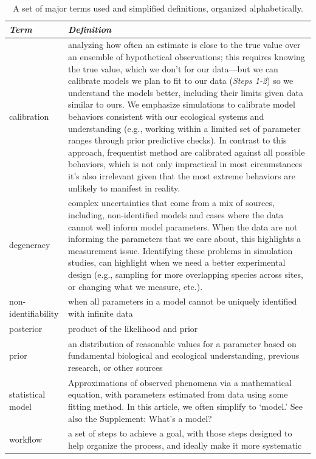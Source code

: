 \documentclass[11pt]{article}
\begin{document}
{\begin{table}
\caption{A set of major terms used and simplified definitions, organized alphabetically.}
\begin{tabular}{ p{3 cm}  p{12 cm} }  \hline \hline
 \emph{Term}   & \emph{Definition}\\ 
\hline \hline
calibration & analyzing how often an estimate is close to the true value over an ensemble of hypothetical observations; this requires knowing the true value, which we don't for our data---but we can calibrate models we plan to fit to our data (\emph{Steps 1-2}) so we understand the models better, including their limits given data similar to ours. We emphasize simulations to calibrate model behaviors consistent with our ecological systems and understanding (e.g., working within a limited set of parameter ranges through prior predictive checks). In contrast to this approach, frequentist method are calibrated against all possible behaviors, which is not only impractical in most circumstances it’s also irrelevant given that the most extreme behaviors are unlikely to manifest in reality. \\\hline
degeneracy & complex uncertainties that come from a mix of sources, including, non-identified models and cases where the data cannot well inform model parameters. When the data are not informing the parameters that we care about, this highlights a measurement issue. Identifying these problems in simulation studies, can highlight when we need a better experimental design (e.g., sampling for more overlapping species across sites, or changing what we measure, etc.).  \\\hline
non-identifiability & when all parameters in a model cannot be uniquely identified with infinite data \\\hline
posterior & product of the likelihood and prior \\\hline
prior & an distribution of reasonable values for a parameter based on fundamental biological and ecological understanding, previous research, or other sources \\\hline
statistical model & Approximations of observed phenomena via a mathematical equation, with parameters estimated from data using some fitting method. In this article, we often simplify to `model.' See also the Supplement: What's a model? \\\hline
workflow & a set of steps to achieve a goal, with those steps designed to help organize the process, and ideally make it more systematic  \\\hline
\hline
\end{tabular}
\label{tab:glossary}
\end{table}


}
\end{document}
